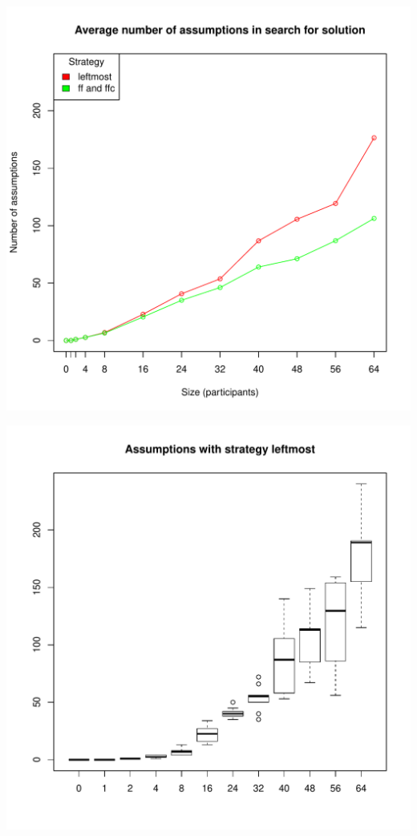 \documentclass{article}
\begin{document}
\includegraphics[width=\linewidth]{assumptions}

\includegraphics[width=\linewidth]{leftmost_assumptions}


\printglossaries{}
\end{document}

